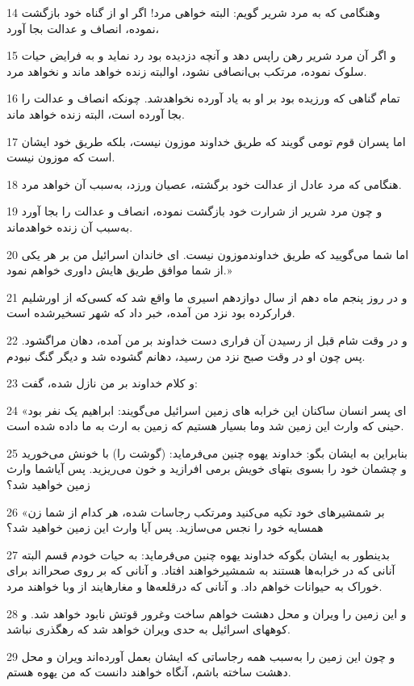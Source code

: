 \par 14 وهنگامی که به مرد شریر گویم: البته خواهی مرد! اگر او از گناه خود بازگشت نموده، انصاف و عدالت بجا آورد،
\par 15 و اگر آن مرد شریر رهن راپس دهد و آنچه دزدیده بود رد نماید و به فرایض حیات سلوک نموده، مرتکب بی‌انصافی نشود، اوالبته زنده خواهد ماند و نخواهد مرد.
\par 16 تمام گناهی که ورزیده بود بر او به یاد آورده نخواهدشد. چونکه انصاف و عدالت را بجا آورده است، البته زنده خواهد ماند.
\par 17 اما پسران قوم تومی گویند که طریق خداوند موزون نیست، بلکه طریق خود ایشان است که موزون نیست.
\par 18 هنگامی که مرد عادل از عدالت خود برگشته، عصیان ورزد، به‌سبب آن خواهد مرد.
\par 19 و چون مرد شریر از شرارت خود بازگشت نموده، انصاف و عدالت را بجا آورد به‌سبب آن زنده خواهدماند.
\par 20 اما شما می‌گویید که طریق خداوندموزون نیست. ای خاندان اسرائیل من بر هر یکی از شما موافق طریق هایش داوری خواهم نمود.»
\par 21 و در روز پنجم ماه دهم از سال دوازدهم اسیری ما واقع شد که کسی‌که از اورشلیم فرارکرده بود نزد من آمده، خبر داد که شهر تسخیرشده است.
\par 22 و در وقت شام قبل از رسیدن آن فراری دست خداوند بر من آمده، دهان مراگشود. پس چون او در وقت صبح نزد من رسید، دهانم گشوده شد و دیگر گنگ نبودم.
\par 23 و کلام خداوند بر من نازل شده، گفت:
\par 24 «ای پسر انسان ساکنان این خرابه های زمین اسرائیل می‌گویند: ابراهیم یک نفر بود حینی که وارث این زمین شد وما بسیار هستیم که زمین به ارث به ما داده شده است.
\par 25 بنابراین به ایشان بگو: خداوند یهوه چنین می‌فرماید: (گوشت را) با خونش می‌خورید و چشمان خود را بسوی بتهای خویش برمی افرازید و خون می‌ریزید. پس آیاشما وارث زمین خواهید شد؟
\par 26 «بر شمشیرهای خود تکیه می‌کنید ومرتکب رجاسات شده، هر کدام از شما زن همسایه خود را نجس می‌سازید. پس آیا وارث این زمین خواهید شد؟
\par 27 بدینطور به ایشان بگوکه خداوند یهوه چنین می‌فرماید: به حیات خودم قسم البته آنانی که در خرابه‌ها هستند به شمشیرخواهند افتاد. و آنانی که بر روی صحرااند برای خوراک به حیوانات خواهم داد. و آنانی که درقلعه‌ها و مغارهایند از وبا خواهند مرد.
\par 28 و این زمین را ویران و محل دهشت خواهم ساخت وغرور قوتش نابود خواهد شد. و کوههای اسرائیل به حدی ویران خواهد شد که رهگذری نباشد.
\par 29 و چون این زمین را به‌سبب همه رجاساتی که ایشان بعمل آورده‌اند ویران و محل دهشت ساخته باشم، آنگاه خواهند دانست که من یهوه هستم.
